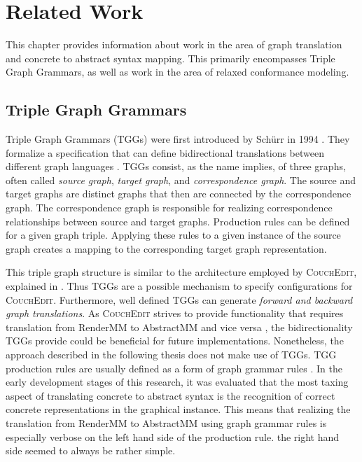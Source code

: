 \chapter{Related Work}
\label{ch:related_work}
This chapter provides information about work in the area of graph translation and concrete to abstract syntax mapping. This primarily encompasses Triple Graph Grammars, as well as work in the area of relaxed conformance modeling.




\section{Triple Graph Grammars}
\label{sec:tggs}
Triple Graph Grammars (TGGs) were first introduced by Schürr in 1994 \cite{schurr_specification_1994}. They formalize a specification that can define bidirectional translations between different graph languages \cite{schurr_15_2008}. TGGs consist, as the name implies, of three graphs, often called \emph{source graph}, \emph{target graph}, and \emph{correspondence graph}. The source and target graphs are distinct graphs that then are connected by the correspondence graph. The correspondence graph is responsible for realizing correspondence relationships between source and target graphs. Production rules can be defined for a given graph triple. Applying these rules to a given instance of the source graph creates a mapping to the corresponding target graph representation.

This triple graph structure is similar to the architecture employed by \textsc{CouchEdit}, explained in . Thus TGGs are a possible mechanism to specify configurations for \textsc{CouchEdit}. Furthermore, well defined TGGs can generate \emph{forward and backward graph translations}. As \textsc{CouchEdit} strives to provide functionality that requires translation from RenderMM to AbstractMM and vice versa \cite{nachreiner_couchedit_2020}, the bidirectionality TGGs provide could be beneficial for future implementations. Nonetheless, the approach described in the following thesis does not make use of TGGs. TGG production rules are usually defined as a form of graph grammar rules \cite{schurr_15_2008}. In the early development stages of this research, it was evaluated that the most taxing aspect of translating concrete to abstract syntax is the recognition of correct concrete representations in the graphical instance. This means that realizing the translation from RenderMM to AbstractMM using graph grammar rules is especially verbose on the left hand side of the production rule. the right hand side seemed to always be rather simple. 

